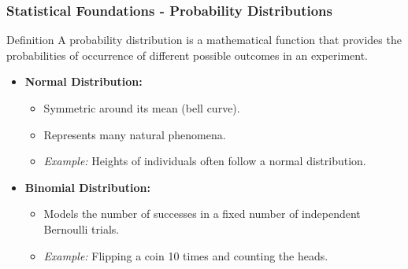 \documentclass{beamer}
\begin{document}
\begin{frame}[fragile]
    \frametitle{Statistical Foundations - Probability Distributions}
    \begin{block}{Definition}
        A probability distribution is a mathematical function that provides the probabilities of occurrence of different possible outcomes in an experiment.
    \end{block}
    
    \begin{itemize}
        \item \textbf{Normal Distribution:} 
        \begin{itemize}
            \item Symmetric around its mean (bell curve).
            \item Represents many natural phenomena.
            \item \textit{Example:} Heights of individuals often follow a normal distribution.
        \end{itemize}
        
        \item \textbf{Binomial Distribution:} 
        \begin{itemize}
            \item Models the number of successes in a fixed number of independent Bernoulli trials.
            \item \textit{Example:} Flipping a coin 10 times and counting the heads.
        \end{itemize}
    \end{itemize}
\end{frame}
\end{document}
